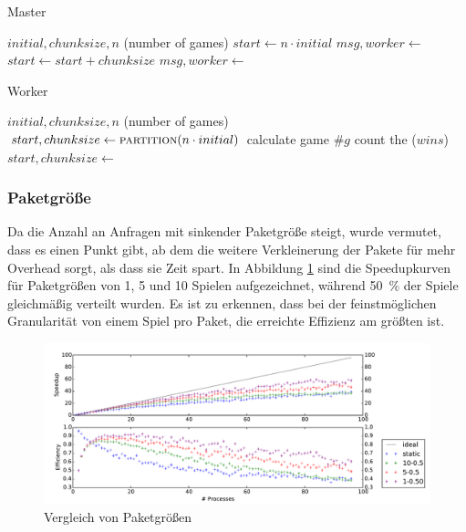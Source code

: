 \begin{algorithm}
    \caption{Master}
    \label{alg:master}
    \begin{algorithmic}[1]
        \Require $initial, chunksize, n$ (number of games)
        \State $start \gets n \cdot initial$
            \State $msg, worker \gets $
            \State {}
            \State $start \gets start + chunksize$
        \EndWhile
            \State $msg, worker \gets $
            \State {}
        \EndFor
    \end{algorithmic}
\end{algorithm}
\begin{algorithm}
    \caption{Worker}
    \label{alg:worker}
    \begin{algorithmic}[1]
        \Require $initial, chunksize, n$ (number of games)
        \State $start, chunksize \gets \Call{partition}{n \cdot initial}$
            \For {$g \in [start, start + chunksize)$}
                \State calculate game $\#g$
                \State count the ($wins$)
            \EndFor
            \State {}
            \State $start, chunksize \gets $
        \EndWhile
    \end{algorithmic}
\end{algorithm}

\subsubsection{Paketgröße}
Da die Anzahl an Anfragen mit sinkender Paketgröße steigt, wurde vermutet, dass
es einen Punkt gibt, ab dem die weitere Verkleinerung der Pakete für mehr
Overhead sorgt, als dass sie Zeit spart.
In Abbildung \ref{fig:speedup_chunksize} sind die Speedupkurven für Paketgrößen
von 1, 5 und 10 Spielen aufgezeichnet, während \SI{50}{\percent} der Spiele
gleichmäßig verteilt wurden. Es ist zu erkennen, dass bei der feinstmöglichen
Granularität von einem Spiel pro Paket, die erreichte Effizienz am größten ist.

\begin{figure}
    \centering
    \includegraphics[width=\textwidth]
        {content/img/strong_scaling_time_chunksize.pdf}
    \caption{Vergleich von Paketgrößen}
    \label{fig:speedup_chunksize}
\end{figure}

